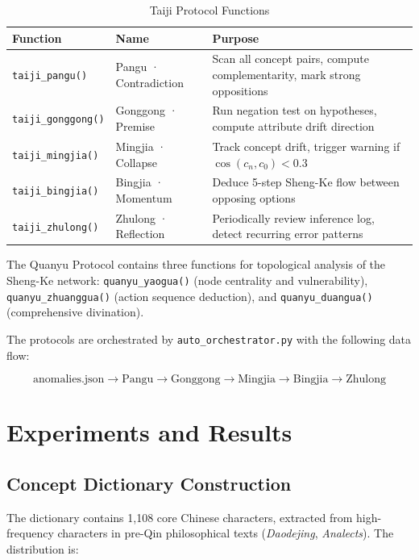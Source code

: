 \documentclass[11pt,a4paper]{article}
\begin{document}
\begin{table}[ht]
\centering
\caption{Taiji Protocol Functions}
\begin{tabular}{lll}
\toprule
Function & Name & Purpose \\
\midrule
\texttt{taiji\_pangu()}    & Pangu · Contradiction  & Scan all concept pairs, compute complementarity, mark strong oppositions \\
\texttt{taiji\_gonggong()} & Gonggong · Premise     & Run negation test on hypotheses, compute attribute drift direction \\
\texttt{taiji\_mingjia()}  & Mingjia · Collapse     & Track concept drift, trigger warning if $\cos(c_n, c_0) < 0.3$ \\
\texttt{taiji\_bingjia()}  & Bingjia · Momentum     & Deduce 5-step Sheng-Ke flow between opposing options \\
\texttt{taiji\_zhulong()}  & Zhulong · Reflection   & Periodically review inference log, detect recurring error patterns \\
\bottomrule
\end{tabular}
\end{table}

The Quanyu Protocol contains three functions for topological analysis of the Sheng-Ke network: \texttt{quanyu\_yaogua()} (node centrality and vulnerability), \texttt{quanyu\_zhuanggua()} (action sequence deduction), and \texttt{quanyu\_duangua()} (comprehensive divination).

The protocols are orchestrated by \texttt{auto\_orchestrator.py} with the following data flow:

\[
\text{anomalies.json} \rightarrow \text{Pangu} \rightarrow \text{Gonggong} \rightarrow \text{Mingjia} \rightarrow \text{Bingjia} \rightarrow \text{Zhulong}
\]

\section{Experiments and Results}

\subsection{Concept Dictionary Construction}

The dictionary contains 1,108 core Chinese characters, extracted from high-frequency characters in pre-Qin philosophical texts (\textit{Daodejing}, \textit{Analects}). The distribution is:
\end{document}
